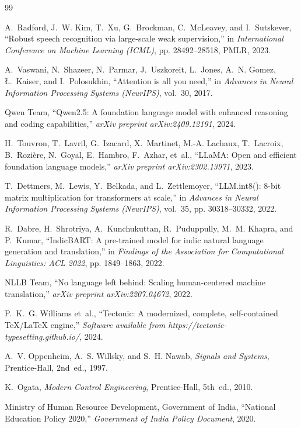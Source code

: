 \documentclass[11pt,a4paper,oneside]{report}
\begin{document}
\begin{thebibliography}{99}

A.~Radford, J.~W. Kim, T.~Xu, G.~Brockman, C.~McLeavey, and I.~Sutskever,
\newblock ``Robust speech recognition via large-scale weak supervision,''
\newblock in \emph{International Conference on Machine Learning (ICML)}, pp. 28492--28518, PMLR, 2023.

A.~Vaswani, N.~Shazeer, N.~Parmar, J.~Uszkoreit, L.~Jones, A.~N. Gomez, {\L}.~Kaiser, and I.~Polosukhin,
\newblock ``Attention is all you need,''
\newblock in \emph{Advances in Neural Information Processing Systems (NeurIPS)}, vol.~30, 2017.

Qwen Team,
\newblock ``Qwen2.5: A foundation language model with enhanced reasoning and coding capabilities,''
\newblock \emph{arXiv preprint arXiv:2409.12191}, 2024.

H.~Touvron, T.~Lavril, G.~Izacard, X.~Martinet, M.-A. Lachaux, T.~Lacroix, B.~Rozi{\`e}re, N.~Goyal, E.~Hambro, F.~Azhar, et~al.,
\newblock ``LLaMA: Open and efficient foundation language models,''
\newblock \emph{arXiv preprint arXiv:2302.13971}, 2023.

T.~Dettmers, M.~Lewis, Y.~Belkada, and L.~Zettlemoyer,
\newblock ``LLM.int8(): 8-bit matrix multiplication for transformers at scale,''
\newblock in \emph{Advances in Neural Information Processing Systems (NeurIPS)}, vol.~35, pp. 30318--30332, 2022.

R.~Dabre, H.~Shrotriya, A.~Kunchukuttan, R.~Puduppully, M.~M. Khapra, and P.~Kumar,
\newblock ``IndicBART: A pre-trained model for indic natural language generation and translation,''
\newblock in \emph{Findings of the Association for Computational Linguistics: ACL 2022}, pp. 1849--1863, 2022.

NLLB Team,
\newblock ``No language left behind: Scaling human-centered machine translation,''
\newblock \emph{arXiv preprint arXiv:2207.04672}, 2022.

P.~K.~G. Williams et~al.,
\newblock ``Tectonic: A modernized, complete, self-contained TeX/LaTeX engine,''
\newblock \emph{Software available from https://tectonic-typesetting.github.io/}, 2024.

A.~V. Oppenheim, A.~S. Willsky, and S.~H. Nawab,
\newblock \emph{Signals and Systems},
\newblock Prentice-Hall, 2nd~ed., 1997.

K.~Ogata,
\newblock \emph{Modern Control Engineering},
\newblock Prentice-Hall, 5th~ed., 2010.

Ministry of Human Resource Development, Government of India,
\newblock ``National Education Policy 2020,''
\newblock \emph{Government of India Policy Document}, 2020.

\end{thebibliography}
\end{document}
